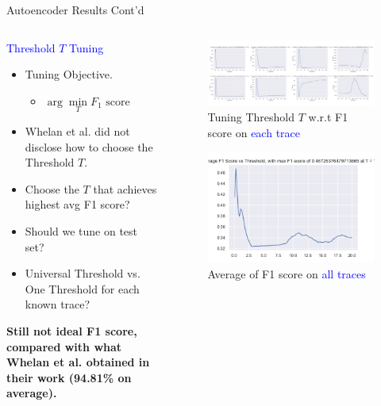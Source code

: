\documentclass[aspectratio=169, 8pt]{beamer}
\begin{document}
\begin{frame}{Autoencoder Results Cont'd}

\begin{columns}

\begin{column}{0.4 \linewidth}
    \textcolor{blue}{\large{Threshold \(T\) Tuning}}
    \begin{itemize}
        \item Tuning Objective.
        \begin{itemize}
            \item \(\arg\min\limits_T F_1 \text{ score}\)
        \end{itemize}
        \item Whelan et al. did not disclose how to choose the Threshold \(T\).
        \item Choose the \(T\) that achieves highest avg F1 score?
        \item Should we tune on test set?
        \item Universal Threshold vs. One Threshold for each known trace?
    \end{itemize}

    \vspace{5mm}

    \textbf{Still not ideal F1 score, compared with what Whelan et al. obtained in their work (94.81\% on average).}
\end{column}


\begin{column}{0.6 \linewidth}
\begin{figure}
    \centering
    \includegraphics[width = 0.7 \linewidth]{images/ae_threshold.png}
    \caption{Tuning Threshold \(T\) w.r.t F1 score on \textcolor{blue}{each trace}}
    \label{fig:enter-label}
\end{figure}

\begin{figure}
    \centering
    \includegraphics[width = 0.3 \linewidth]{images/avg_trace_f1.png}
    \caption{Average of F1 score on \textcolor{blue}{all traces}}
    \label{fig:enter-label}
\end{figure}
\end{column}

\end{columns}





    
\end{frame}
\end{document}
